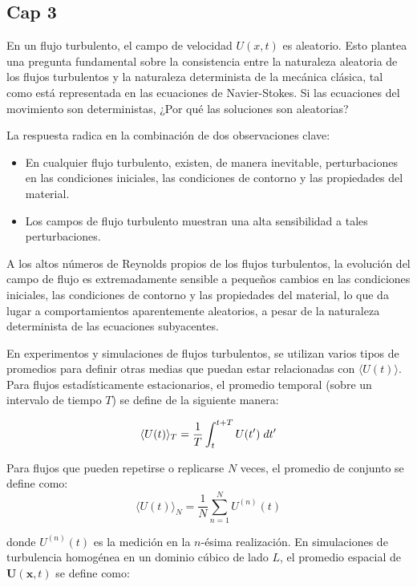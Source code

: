 \subsection{Cap 3}

En un flujo turbulento, el campo de velocidad $U(x,t)$ es aleatorio. Esto plantea una pregunta fundamental sobre la consistencia entre la naturaleza aleatoria de los flujos turbulentos y la naturaleza determinista de la mecánica clásica, tal como está representada en las ecuaciones de Navier-Stokes. Si las ecuaciones del movimiento son deterministas, ¿Por qué las soluciones son aleatorias?

La respuesta radica en la combinación de dos observaciones clave:

\begin{itemize}
	\item En cualquier flujo turbulento, existen, de manera inevitable, perturbaciones en las condiciones iniciales, las condiciones de contorno y las propiedades del material.
	\item Los campos de flujo turbulento muestran una alta sensibilidad a tales perturbaciones.
\end{itemize}
    
A los altos números de Reynolds propios de los flujos turbulentos, la evolución del campo de flujo es extremadamente sensible a pequeños cambios en las condiciones iniciales, las condiciones de contorno y las propiedades del material, lo que da lugar a comportamientos aparentemente aleatorios, a pesar de la naturaleza determinista de las ecuaciones subyacentes.


En experimentos y simulaciones de flujos turbulentos, se utilizan varios tipos de promedios para definir otras medias que puedan estar relacionadas con $ \langle U(t) \rangle$. Para flujos estadísticamente estacionarios, el promedio temporal (sobre un intervalo de tiempo $T$) se define de la siguiente manera:

$$\langle U(t) \rangle_T = \frac{1}{T} \int_t^{t+T} U(t') \hspace*{1mm} dt'$$

Para flujos que pueden repetirse o replicarse \( N \) veces, el promedio de conjunto se define como:
$$\langle U(t) \rangle_N = \frac{1}{N} \sum_{n=1}^{N} U^{(n)}(t)$$

donde  $U^{(n)}(t)$ es la medición en la  $n$-ésima realización. En simulaciones de turbulencia homogénea en un dominio cúbico de lado $L$, el promedio espacial de $\mathbf{U}(\mathbf{x},t)$ se define como:


